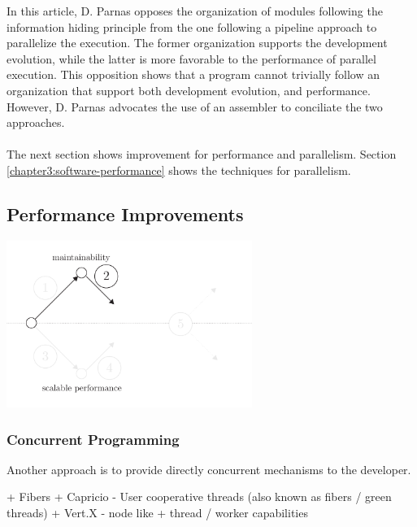 In this article, D. Parnas opposes the organization of modules following the information hiding principle from the one following a pipeline approach to parallelize the execution.
The former organization supports the development evolution, while the latter is more favorable to the performance of parallel execution.
This opposition shows that a program cannot trivially follow an organization that support both development evolution, and performance.
However, D. Parnas advocates the use of an assembler to conciliate the two approaches.

\paragraph{}

The next section shows improvement for performance and parallelism.
Section \ref{chapter3:software-performance} shows the techniques for parallelism.

\subsection{Performance Improvements}

\begin{center}
\includegraphics[width=0.6\textwidth]{../ressources/state-of-the-art-2.pdf}
\end{center}

\subsubsection{Concurrent Programming}


Another approach is to provide directly concurrent mechanisms to the developer.

+ Fibers \cite{Adya2002} + Capricio - User cooperative threads (also known as fibers / green threads)
+ Vert.X - node like + thread / worker capabilities

